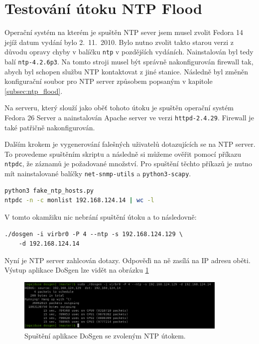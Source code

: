 \section{Testování útoku NTP Flood}
Operační systém na kterém je spuštěn NTP sever jsem musel zvolit Fedora 14 jejíž datum vydání bylo 2.\ 11.\ 2010. Bylo nutno zvolit takto starou verzi z důvodu opravy chyby v balíčku \texttt{ntp} v pozdějších vydáních. Nainstalován byl tedy balí \texttt{ntp-4.2.6p3}. Na tomto stroji musel být správně nakonfigurován firewall tak, abych byl schopen službu NTP kontaktovat z jiné stanice. Následně byl změněn konfigurační soubor pro NTP server způsobem popsaným v kapitole \ref{subsec:ntp_flood}.

Na serveru, který slouží jako oběť tohoto útoku je spuštěn operační systém Fedora 26 Server a nainstalován Apache server ve verzi \texttt{httpd-2.4.29}. Firewall je také patřičně nakonfigurován.

Dalším krokem je vygenerování falešných uživatelů dotazujících se na NTP server. To provedeme spuštěním skriptu a následně si můžeme ověřit pomocí příkazu \texttt{ntpdc}, že záznamů je požadované množství. Pro spuštění těchto příkazů je nutno mít nainstalované balíčky \texttt{net-snmp-utils} a \texttt{python3-scapy}.

\begin{lstlisting}[language=bash]
python3 fake_ntp_hosts.py
ntpdc -n -c monlist 192.168.124.14 | wc -l
\end{lstlisting}

\noindent V tomto okamžiku nic nebrání spuštění útoku a to následovně:
\begin{lstlisting}
./dosgen -i virbr0 -P 4 --ntp -s 192.168.124.129 \
	-d 192.168.124.14
\end{lstlisting}

Nyní je NTP server zahlcován dotazy. Odpověďi na ně zasílá na IP adresu oběti. Výstup aplikace DoSgen lze vidět na obrázku \ref{fig:dosgen_run_ntp-img}

\begin{figure} [ht]
	\centering
	\includegraphics[width=0.9\textwidth]{obrazky/dosgen_terminal_run_ntp.png}
	\caption{Spuštění aplikace DoSgen se zvoleným NTP útokem.}
	\label{fig:dosgen_run_ntp-img}
\end{figure}

